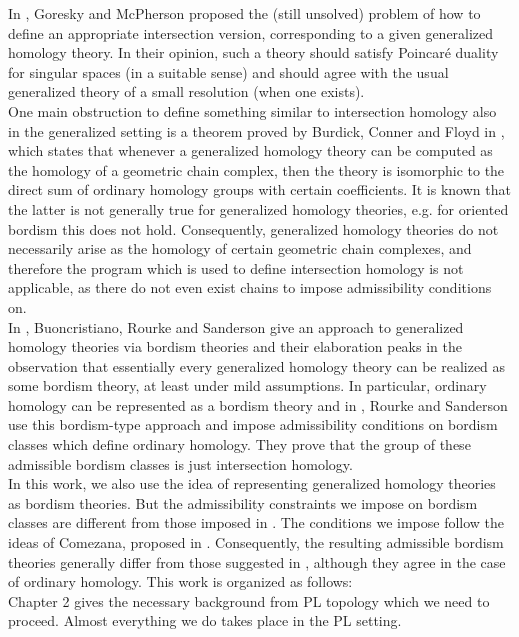 \documentclass{scrreprt}
\begin{document}
In \cite{problemsIH}, Goresky and McPherson proposed the (still unsolved) problem of how to define an appropriate intersection version, corresponding to a given generalized homology theory. In their opinion, such a theory should satisfy Poincar\'{e} duality for singular spaces (in a suitable sense) and should agree with the usual generalized theory of a small resolution (when one exists). \\
One main obstruction to define something similar to intersection homology also in the generalized setting is a theorem proved by Burdick, Conner and Floyd in \cite{bcf}, which states that whenever a generalized homology theory can be computed as the homology of a geometric chain complex, then the theory is isomorphic to the direct sum of ordinary homology groups with certain coefficients. It is known that the latter is not generally true for generalized homology theories, e.g. for oriented bordism this does not hold. Consequently, generalized homology theories do not necessarily arise as the homology of certain geometric chain complexes, and therefore the program which is used to define intersection homology is not applicable, as there do not even exist chains to impose admissibility conditions on. \\
In \cite{BRS}, Buoncristiano, Rourke and Sanderson give an approach to generalized homology theories via bordism theories and their elaboration peaks in the observation that essentially every generalized homology theory can be realized as some bordism theory, at least under mild assumptions. In particular, ordinary homology can be represented as a bordism theory and in \cite{rourkestratifications}, Rourke and Sanderson use this bordism-type approach and impose admissibility conditions on bordism classes which define ordinary homology. They prove that the group of these admissible bordism classes is just intersection homology. \\
In this work, we also use the idea of representing generalized homology theories as bordism theories. But the admissibility constraints we impose on bordism classes are different from those imposed in \cite{rourkestratifications}. The conditions we impose follow the ideas of Comezana, proposed in \cite{comezana}.  Consequently, the resulting admissible bordism theories generally differ from those suggested in \cite{rourkestratifications}, although they agree in the case of ordinary homology. This work is organized as follows: \\
Chapter 2 gives the necessary background from PL topology which we need to proceed. Almost everything we do takes place in the PL setting. \\
\end{document}
